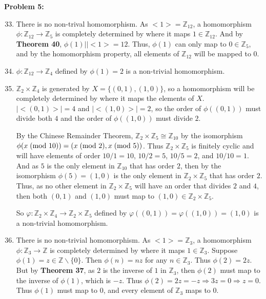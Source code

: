 \documentclass[12pt, letterpaper]{article}
\newenvironment{problem}
    [1]
    {\noindent \textbf{Problem #1:}}
    {\vspace{3mm}}
\begin{document}
\begin{problem}{5}
    \begin{enumerate}
        \setcounter{enumi}{32}
        \item There is no non-trival homomorphism. As ${<}1{>} = \mathbb{Z}_{12}$,
        a homomorphism $\phi: \mathbb{Z}_{12} \rightarrow \mathbb{Z}_5$ is completely
        determined by where it maps $1 \in \mathbb{Z}_{12}$. And by \textbf{Theorem 40}, 
        $\phi(1) | |{<}1{>} = 12$. Thus, $\phi(1)$ can only map to $0 \in \mathbb{Z}_5$,
        and by the homomorphism property, all elements of $\mathbb{Z}_{12}$ will be mapped
        to $0$.

        \item $\phi: \mathbb{Z}_{12} \rightarrow \mathbb{Z}_4$ defined by $\phi(1) = 2$
        is a non-trivial homomorphism.

        \item $\mathbb{Z}_2 \times \mathbb{Z}_4$ is generated by $X = \{(0,1), (1,0)\}$, so 
        a homomorphism will be completely determined by where it maps the elements of $X$.
        $|{<}(0,1){>}| = 4$ and $|{<}(1,0){>}| = 2$, so the order of $\phi((0,1))$
        must divide both $4$ and the order of $\phi((1,0))$ must divide $2$.

        \bigskip\noindent
        By the Chinese Remainder Theorem, $\mathbb{Z}_2 \times \mathbb{Z}_5 \cong \mathbb{Z}_{10}$
        by the isomorphism $\phi(x \;(\text{mod 10}))\\ = (x \;(\text{mod 2}), x \;(\text{mod 5}))$.
        Thus $\mathbb{Z}_2 \times \mathbb{Z}_5$ is finitely cyclic and will have elements of order
        $10/1 = 10$, $10/2 = 5$, $10/5 = 2$, and $10/10 = 1$. And as $5$ is the only element in 
        $\mathbb{Z}_{10}$ that has order $2$, then by the isomorphism $\phi(5) = (1, 0)$ is the
        only element in $\mathbb{Z}_2 \times \mathbb{Z}_5$ that has order $2$. Thus, as no other
        element in $\mathbb{Z}_2 \times \mathbb{Z}_5$ will have an order that divides $2$ and $4$,
        then both $(0, 1)$ and $(1, 0)$ must map to $(1, 0) \in \mathbb{Z}_2 \times \mathbb{Z}_5$.

        \bigskip\noindent
        So $\varphi: \mathbb{Z}_2 \times \mathbb{Z}_4 \rightarrow \mathbb{Z}_2 \times \mathbb{Z}_5$
        defined by $\varphi((0, 1)) = \varphi((1, 0)) = (1, 0)$ is a non-trivial homomorphism.

        \item There is no non-trivial homomorphism. As ${<}1{>} = \mathbb{Z}_{3}$,
        a homomorphism $\phi: \mathbb{Z}_{3} \rightarrow \mathbb{Z}$ is completely
        determined by where it maps $1 \in \mathbb{Z}_{3}$. Suppose $\phi(1) = z \in \mathbb{Z} 
        \backslash \{0\}$. Then $\phi(n) = nz$ for any $n \in \mathbb{Z}_3$. Thus $\phi(2) = 2z$. 
        But by \textbf{Theorem 37}, as $2$ is the inverse of $1$ in $\mathbb{Z}_3$, then $\phi(2)$ 
        must map to the inverse of $\phi(1)$, which is $-z$. Thus $\phi(2) = 2z = -z \Rightarrow
        3z = 0 \Rightarrow z = 0$. Thus $\phi(1)$ must map to $0$, and every element
        of $\mathbb{Z}_3$ maps to $0$.


\end{enumerate}
\end{problem}
\end{document}
